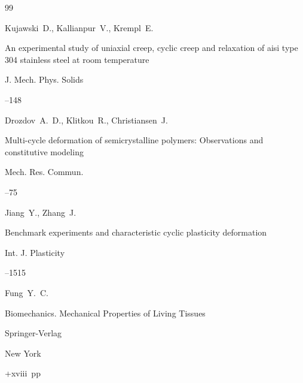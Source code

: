 \begin{thebibliography}{99}

\by Kujawski~D., Kallianpur~V., Krempl~E.

\paper An experimental study of uniaxial creep, cyclic creep and relaxation of aisi type 304 stainless steel at room temperature

\jour J. Mech. Phys. Solids




--148







\by Drozdov~A.~D., Klitkou~R., Christiansen~J.

\paper Multi-cycle deformation of semicrystalline polymers: Observations and constitutive modeling

\jour Mech. Res. Commun.



--75







\by Jiang~Y., Zhang~J.

\paper Benchmark experiments and characteristic cyclic plasticity deformation

\jour Int. J. Plasticity




--1515







\by Fung~Y.~C.

\book Biomechanics. Mechanical Properties of Living Tissues


\publ Springer-Verlag

\publaddr New York

+xviii~pp \nofrills







\end{thebibliography}
